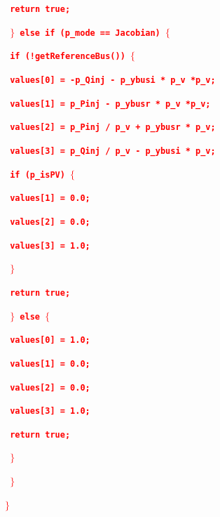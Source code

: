 \documentclass[12pt]{report} %
\begin{document}
\textcolor{red}{\texttt{\textbf{    return true;}}}

\textcolor{red}{\texttt{\textbf{  $\boldsymbol{\mathrm{\}}}$ else if (p\_mode == Jacobian) $\boldsymbol{\mathrm{\{}}$}}}

\textcolor{red}{\texttt{\textbf{    if (!getReferenceBus()) $\boldsymbol{\mathrm{\{}}$}}}

\textcolor{red}{\texttt{\textbf{      values[0] = -p\_Qinj - p\_ybusi * p\_v *p\_v;}}}

\textcolor{red}{\texttt{\textbf{      values[1] = p\_Pinj - p\_ybusr * p\_v *p\_v;}}}

\textcolor{red}{\texttt{\textbf{      values[2] = p\_Pinj / p\_v + p\_ybusr * p\_v;}}}

\textcolor{red}{\texttt{\textbf{      values[3] = p\_Qinj / p\_v - p\_ybusi * p\_v;}}}

\textcolor{red}{\texttt{\textbf{      if (p\_isPV) $\boldsymbol{\mathrm{\{}}$}}}

\textcolor{red}{\texttt{\textbf{        values[1] = 0.0;}}}

\textcolor{red}{\texttt{\textbf{        values[2] = 0.0;}}}

\textcolor{red}{\texttt{\textbf{        values[3] = 1.0;}}}

\textcolor{red}{\texttt{\textbf{      $\boldsymbol{\mathrm{\}}}$}}}

\textcolor{red}{\texttt{\textbf{      return true;}}}

\textcolor{red}{\texttt{\textbf{    $\boldsymbol{\mathrm{\}}}$ else $\boldsymbol{\mathrm{\{}}$}}}

\textcolor{red}{\texttt{\textbf{      values[0] = 1.0;}}}

\textcolor{red}{\texttt{\textbf{      values[1] = 0.0;}}}

\textcolor{red}{\texttt{\textbf{      values[2] = 0.0;}}}

\textcolor{red}{\texttt{\textbf{      values[3] = 1.0;}}}

\textcolor{red}{\texttt{\textbf{      return true;}}}

\textcolor{red}{\texttt{\textbf{    $\boldsymbol{\mathrm{\}}}$}}}

\textcolor{red}{\texttt{\textbf{  $\boldsymbol{\mathrm{\}}}$}}}

\textcolor{red}{\texttt{\textbf{$\boldsymbol{\mathrm{\}}}$}}}
\end{document}
